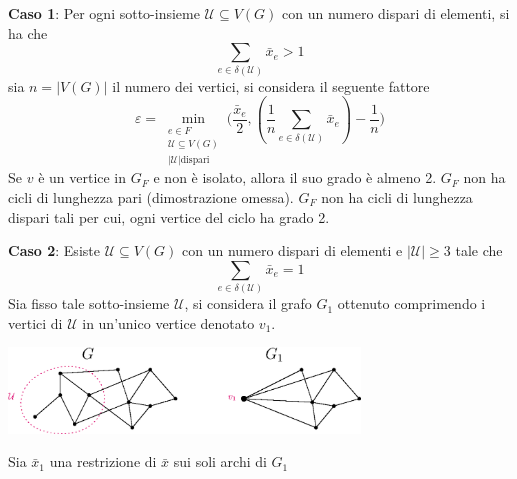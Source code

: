 \documentclass[10pt, letterpaper]{report}
\begin{document}
\noindent\textbf{Caso 1}: Per ogni sotto-insieme $\mathcal U\subseteq V(G)$ con un numero dispari di elementi, si ha che 
$$\sum_{e\in\delta(\mathcal U)}\bar x_e>1 $$
sia $n=|V(G)|$ il numero dei vertici, si considera il seguente fattore\begin{equation}
    \varepsilon=\min_{\begin{matrix}
    e\in F\\ 
    \mathcal U\subseteq V(G)\\ 
    |\mathcal U| \text{dispari}
    \end{matrix}}\Big(
        \frac{\bar x_e}{2}, (\frac{1}{n}\sum_{e\in\delta(\mathcal U)}\bar x_e)-\frac{1}{n}
    \Big)
\end{equation}
Se $v$ è un vertice in $G_F$ e non è isolato, allora il suo grado è almeno 2. $G_F$ non ha cicli di lunghezza pari (dimostrazione omessa). $G_F$ non ha cicli di lunghezza dispari tali per cui, ogni vertice del ciclo ha grado 2. \bigskip

\noindent\textbf{Caso 2}: Esiste $\mathcal U\subseteq V(G)$ con un numero dispari di elementi e $|\mathcal U|\ge 3$ tale che 
$$\sum_{e\in\delta(\mathcal U)}\bar x_e=1 $$
Sia fisso tale sotto-insieme $\mathcal U$, si considera il grafo $G_1$ ottenuto comprimendo i vertici di $\mathcal U$ in un'unico vertice denotato $v_1$.\begin{center}
    \includegraphics[width=0.7\textwidth ]{images/compressione.eps}
\end{center}
Sia $\bar x_1$ una restrizione di $\bar x$ sui soli archi di $G_1$
\end{document}
